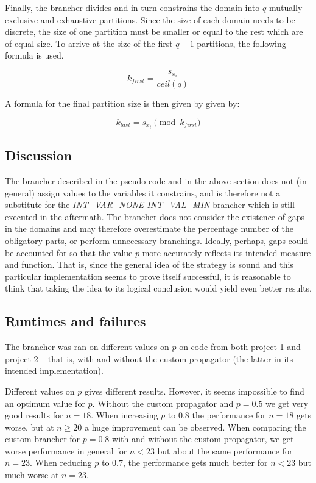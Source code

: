 \documentclass[a4paper,11pt]{article}
\begin{document}
Finally, the brancher divides and in turn constrains the domain into $q$ mutually exclusive and exhaustive partitions. Since the size of each domain needs to be discrete, the size of one partition must be smaller or equal to the rest which are of equal size. To arrive at the size of the first $q-1$ partitions, the following formula is used.

\begin{equation}
k_{first} = \frac{s_{x_i}}{ceil(q)} 
\end{equation}

A formula for the final partition size is then given by given by:

\begin{equation}
k_{last} = s_{x_i} \pmod{k_{first}}
\end{equation}

\subsection{Discussion}

The brancher described in the pseudo code and in the above section does not (in general) assign values to the variables it constrains, and is therefore not a substitute for the \emph{INT\_VAR\_NONE-INT\_VAL\_MIN} brancher which is still executed in the aftermath. The brancher does not consider the existence of gaps in the domains and may therefore overestimate the percentage number of the  obligatory parts, or perform unnecessary branchings. Ideally, perhaps, gaps could be accounted for so that the value $p$ more accurately reflects its intended measure and function. That is, since the general idea of the strategy is sound and this particular implementation seems to prove itself successful, it is reasonable to think that taking the idea to its logical conclusion would yield even better results.


\subsection{Runtimes and failures}

The brancher was ran on different values on $p$ on code from both project 1 and project 2 -- that is, with and without the custom propagator (the latter in its intended implementation).

Different values on $p$ gives different results. However, it seems impossible to find an optimum value for $p$. Without the custom propagator and $p=0.5$ we get very good results for $n=18$. When increasing $p$ to $0.8$ the performance for $n=18$ gets worse, but at $n \geq 20$ a huge improvement can be observed. When comparing the custom brancher for $p=0.8$ with and without the custom propagator, we get worse performance in general for $n<23$ but about the same performance for $n=23$. When reducing $p$ to $0.7$, the performance gets much better for $n<23$ but much worse at $n=23$.
\end{document}
